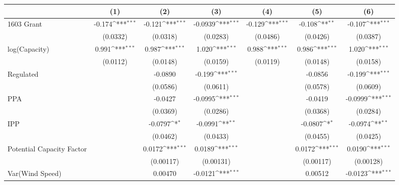 {
\def\sym#1{\ifmmode^{#1}\else\(^{#1}\)\fi}
\begin{tabular}{l*{6}{c}}
\toprule
                &\multicolumn{1}{c}{(1)}         &\multicolumn{1}{c}{(2)}         &\multicolumn{1}{c}{(3)}         &\multicolumn{1}{c}{(4)}         &\multicolumn{1}{c}{(5)}         &\multicolumn{1}{c}{(6)}         \\
\midrule
1603 Grant      &   -0.174\sym{***}&   -0.121\sym{***}&  -0.0939\sym{***}&   -0.129\sym{***}&   -0.108\sym{**} &   -0.107\sym{***}\\
                & (0.0332)         & (0.0318)         & (0.0283)         & (0.0486)         & (0.0426)         & (0.0387)         \\
\addlinespace
log(Capacity)   &    0.991\sym{***}&    0.987\sym{***}&    1.020\sym{***}&    0.988\sym{***}&    0.986\sym{***}&    1.020\sym{***}\\
                & (0.0112)         & (0.0148)         & (0.0159)         & (0.0119)         & (0.0148)         & (0.0158)         \\
\addlinespace
Regulated       &                  &  -0.0890         &   -0.199\sym{***}&                  &  -0.0856         &   -0.199\sym{***}\\
                &                  & (0.0586)         & (0.0611)         &                  & (0.0578)         & (0.0609)         \\
\addlinespace
PPA             &                  &  -0.0427         &  -0.0995\sym{***}&                  &  -0.0419         &  -0.0999\sym{***}\\
                &                  & (0.0369)         & (0.0286)         &                  & (0.0368)         & (0.0284)         \\
\addlinespace
IPP             &                  &  -0.0797\sym{*}  &  -0.0991\sym{**} &                  &  -0.0807\sym{*}  &  -0.0974\sym{**} \\
                &                  & (0.0462)         & (0.0433)         &                  & (0.0455)         & (0.0425)         \\
\addlinespace
Potential Capacity Factor&                  &   0.0172\sym{***}&   0.0189\sym{***}&                  &   0.0172\sym{***}&   0.0190\sym{***}\\
                &                  &(0.00117)         &(0.00131)         &                  &(0.00117)         &(0.00128)         \\
\addlinespace
Var(Wind Speed) &                  &  0.00470         &  -0.0121\sym{***}&                  &  0.00512         &  -0.0123\sym{***}\\

\end{tabular}}

